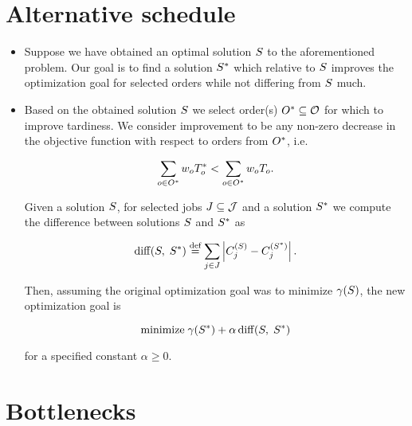 \section{Alternative schedule}

\begin{itemize}
    \item Suppose we have obtained an optimal solution $S$ to the aforementioned problem.
        Our goal is to find a solution $S^*$ which relative to $S$ improves
        the optimization goal for selected orders while not differing from $S$ much.

    \item Based on the obtained solution $S$ we select order(s) $O^* \subseteq \mathcal{O}$
        for which to improve tardiness.
        We consider improvement to be any non-zero decrease in the objective function with respect to orders from $O^*$,
        i.e.

        $$
        \sum_{o \in O^*} w_{o} T_{o}^* < \sum_{o \in O^*} w_{o} T_{o}.
        $$

        Given a solution $S$, for selected jobs $J \subseteq \mathcal{J}$ and a solution $S^*$
        we compute the difference between solutions $S$ and $S^*$ as

        $$
        \operatorname{diff}\hspace{-0.2em}\left( S ,\; S^* \right) \overset{\text{def}}{=} \sum_{j \in J} \left|{C_{j}^{(S)} - C_{j}^{(S^*)}}\right|.
        $$

        Then, assuming the original optimization goal was to minimize $\gamma(S)$, the new optimization goal
        is

        $$
        \text{minimize}\; \gamma(S^*) + \alpha \operatorname{diff}\hspace{-0.2em}\left( S ,\; S^* \right)
        $$

        for a specified constant $\alpha \geq 0$.
\end{itemize}

\section{Bottlenecks}

